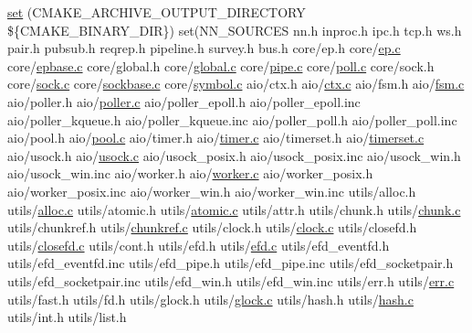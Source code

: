 \begin{DoxyCompactItemize}
\hyperlink{CMakeLists_8txt_a579d71c62358564a70db1ec36650b8eb}{set} (C\+M\+A\+K\+E\+\_\+\+A\+R\+C\+H\+I\+V\+E\+\_\+\+O\+U\+T\+P\+U\+T\+\_\+\+D\+I\+R\+E\+C\+T\+O\+RY \$\{C\+M\+A\+K\+E\+\_\+\+B\+I\+N\+A\+R\+Y\+\_\+\+D\+IR\}) set(N\+N\+\_\+\+S\+O\+U\+R\+C\+ES nn.\+h inproc.\+h ipc.\+h tcp.\+h ws.\+h pair.\+h pubsub.\+h reqrep.\+h pipeline.\+h survey.\+h bus.\+h core/ep.\+h core/\hyperlink{all__1_8js_a7d4a455e4f44360eeccfbf0c3079fc32}{ep.\+c} core/\hyperlink{all__1_8js_a7d4a455e4f44360eeccfbf0c3079fc32}{epbase.\+c} core/global.\+h core/\hyperlink{all__1_8js_a7d4a455e4f44360eeccfbf0c3079fc32}{global.\+c} core/\hyperlink{all__1_8js_a7d4a455e4f44360eeccfbf0c3079fc32}{pipe.\+c} core/\hyperlink{all__1_8js_a7d4a455e4f44360eeccfbf0c3079fc32}{poll.\+c} core/sock.\+h core/\hyperlink{all__1_8js_a7d4a455e4f44360eeccfbf0c3079fc32}{sock.\+c} core/\hyperlink{all__1_8js_a7d4a455e4f44360eeccfbf0c3079fc32}{sockbase.\+c} core/\hyperlink{all__1_8js_a7d4a455e4f44360eeccfbf0c3079fc32}{symbol.\+c} aio/ctx.\+h aio/\hyperlink{all__1_8js_a7d4a455e4f44360eeccfbf0c3079fc32}{ctx.\+c} aio/fsm.\+h aio/\hyperlink{all__1_8js_a7d4a455e4f44360eeccfbf0c3079fc32}{fsm.\+c} aio/poller.\+h aio/\hyperlink{all__1_8js_a7d4a455e4f44360eeccfbf0c3079fc32}{poller.\+c} aio/poller\+\_\+epoll.\+h aio/poller\+\_\+epoll.\+inc aio/poller\+\_\+kqueue.\+h aio/poller\+\_\+kqueue.\+inc aio/poller\+\_\+poll.\+h aio/poller\+\_\+poll.\+inc aio/pool.\+h aio/\hyperlink{all__1_8js_a7d4a455e4f44360eeccfbf0c3079fc32}{pool.\+c} aio/timer.\+h aio/\hyperlink{all__1_8js_a7d4a455e4f44360eeccfbf0c3079fc32}{timer.\+c} aio/timerset.\+h aio/\hyperlink{all__1_8js_a7d4a455e4f44360eeccfbf0c3079fc32}{timerset.\+c} aio/usock.\+h aio/\hyperlink{all__1_8js_a7d4a455e4f44360eeccfbf0c3079fc32}{usock.\+c} aio/usock\+\_\+posix.\+h aio/usock\+\_\+posix.\+inc aio/usock\+\_\+win.\+h aio/usock\+\_\+win.\+inc aio/worker.\+h aio/\hyperlink{all__1_8js_a7d4a455e4f44360eeccfbf0c3079fc32}{worker.\+c} aio/worker\+\_\+posix.\+h aio/worker\+\_\+posix.\+inc aio/worker\+\_\+win.\+h aio/worker\+\_\+win.\+inc utils/alloc.\+h utils/\hyperlink{all__1_8js_a7d4a455e4f44360eeccfbf0c3079fc32}{alloc.\+c} utils/atomic.\+h utils/\hyperlink{all__1_8js_a7d4a455e4f44360eeccfbf0c3079fc32}{atomic.\+c} utils/attr.\+h utils/chunk.\+h utils/\hyperlink{all__1_8js_a7d4a455e4f44360eeccfbf0c3079fc32}{chunk.\+c} utils/chunkref.\+h utils/\hyperlink{all__1_8js_a7d4a455e4f44360eeccfbf0c3079fc32}{chunkref.\+c} utils/clock.\+h utils/\hyperlink{all__1_8js_a7d4a455e4f44360eeccfbf0c3079fc32}{clock.\+c} utils/closefd.\+h utils/\hyperlink{all__1_8js_a7d4a455e4f44360eeccfbf0c3079fc32}{closefd.\+c} utils/cont.\+h utils/efd.\+h utils/\hyperlink{all__1_8js_a7d4a455e4f44360eeccfbf0c3079fc32}{efd.\+c} utils/efd\+\_\+eventfd.\+h utils/efd\+\_\+eventfd.\+inc utils/efd\+\_\+pipe.\+h utils/efd\+\_\+pipe.\+inc utils/efd\+\_\+socketpair.\+h utils/efd\+\_\+socketpair.\+inc utils/efd\+\_\+win.\+h utils/efd\+\_\+win.\+inc utils/err.\+h utils/\hyperlink{all__1_8js_a7d4a455e4f44360eeccfbf0c3079fc32}{err.\+c} utils/fast.\+h utils/fd.\+h utils/glock.\+h utils/\hyperlink{all__1_8js_a7d4a455e4f44360eeccfbf0c3079fc32}{glock.\+c} utils/hash.\+h utils/\hyperlink{all__1_8js_a7d4a455e4f44360eeccfbf0c3079fc32}{hash.\+c} utils/int.\+h utils/list.\+h 
\end{DoxyCompactItemize}
